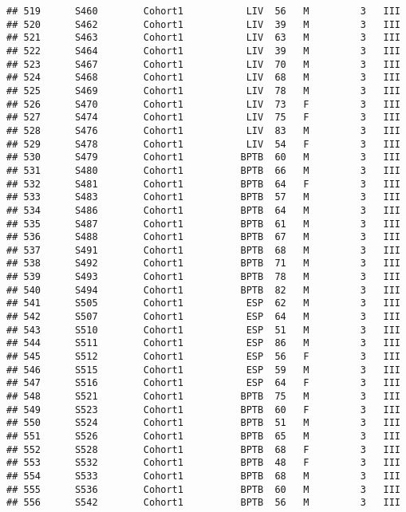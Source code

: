 \documentclass[
]{article}
\begin{document}
\begin{verbatim}
## 519      S460        Cohort1           LIV  56   M         3   III
## 520      S462        Cohort1           LIV  39   M         3   III
## 521      S463        Cohort1           LIV  63   M         3   III
## 522      S464        Cohort1           LIV  39   M         3   III
## 523      S467        Cohort1           LIV  70   M         3   III
## 524      S468        Cohort1           LIV  68   M         3   III
## 525      S469        Cohort1           LIV  78   M         3   III
## 526      S470        Cohort1           LIV  73   F         3   III
## 527      S474        Cohort1           LIV  75   F         3   III
## 528      S476        Cohort1           LIV  83   M         3   III
## 529      S478        Cohort1           LIV  54   F         3   III
## 530      S479        Cohort1          BPTB  60   M         3   III
## 531      S480        Cohort1          BPTB  66   M         3   III
## 532      S481        Cohort1          BPTB  64   F         3   III
## 533      S483        Cohort1          BPTB  57   M         3   III
## 534      S486        Cohort1          BPTB  64   M         3   III
## 535      S487        Cohort1          BPTB  61   M         3   III
## 536      S488        Cohort1          BPTB  67   M         3   III
## 537      S491        Cohort1          BPTB  68   M         3   III
## 538      S492        Cohort1          BPTB  71   M         3   III
## 539      S493        Cohort1          BPTB  78   M         3   III
## 540      S494        Cohort1          BPTB  82   M         3   III
## 541      S505        Cohort1           ESP  62   M         3   III
## 542      S507        Cohort1           ESP  64   M         3   III
## 543      S510        Cohort1           ESP  51   M         3   III
## 544      S511        Cohort1           ESP  86   M         3   III
## 545      S512        Cohort1           ESP  56   F         3   III
## 546      S515        Cohort1           ESP  59   M         3   III
## 547      S516        Cohort1           ESP  64   F         3   III
## 548      S521        Cohort1          BPTB  75   M         3   III
## 549      S523        Cohort1          BPTB  60   F         3   III
## 550      S524        Cohort1          BPTB  51   M         3   III
## 551      S526        Cohort1          BPTB  65   M         3   III
## 552      S528        Cohort1          BPTB  68   F         3   III
## 553      S532        Cohort1          BPTB  48   F         3   III
## 554      S533        Cohort1          BPTB  68   M         3   III
## 555      S536        Cohort1          BPTB  60   M         3   III
## 556      S542        Cohort1          BPTB  56   M         3   III

\end{verbatim}
\end{document}
